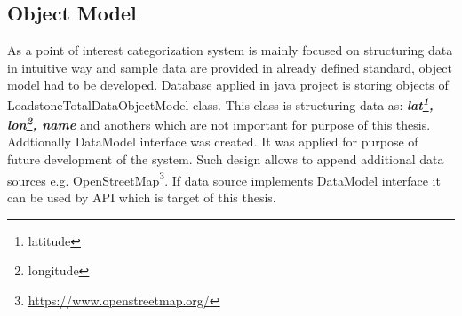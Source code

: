 \subsection{Object Model}
As a point of interest categorization system is mainly focused on structuring data in intuitive way and sample data are provided in already defined standard, object model had to be developed. Database applied in java project is storing objects of LoadstoneTotalDataObjectModel class. This class is structuring data as: \textit{\textbf{lat\footnote{latitude}, lon\footnote{longitude}, name}} and anothers which are not important for purpose of this thesis. Addtionally DataModel interface was created. It was applied for purpose of future development of the system. Such design allows to append additional data sources e.g. OpenStreetMap\footnote{\url{https://www.openstreetmap.org/}}. If data source implements DataModel interface it can be used by API which is target of this thesis.      